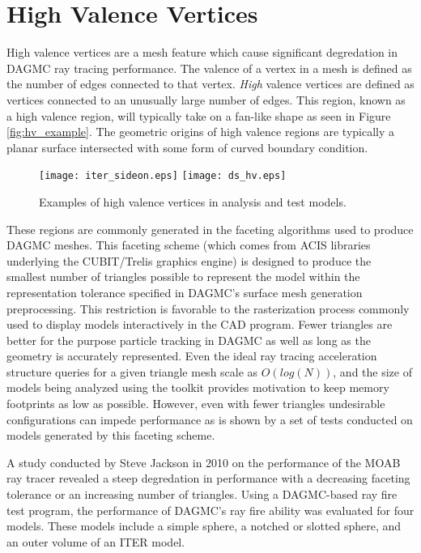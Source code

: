 

\chapter{High Valence Vertices}\label{ch:high_valence}

High valence vertices are a mesh feature which cause significant degredation in
DAGMC ray tracing performance. The valence of a vertex in a mesh is defined as
the number of edges connected to that vertex. \textit{High} valence vertices are
defined as vertices connected to an unusually large number of edges. This
region, known as a high valence region, will typically take on a fan-like shape
as seen in Figure \ref{fig:hv_example}.  The geometric origins of high valence
regions are typically a planar surface intersected with some form of curved
boundary condition. 

\begin{figure}[H]
  \centering
  \texttt{[image: iter\_sideon.eps]}
  \texttt{[image: ds\_hv.eps]}
  \caption{Examples of high valence vertices in analysis and test models.}
  \label{fig:hv_examples}
\end{figure}

These regions are commonly generated in the faceting algorithms used to produce
DAGMC meshes. This faceting scheme (which comes from ACIS libraries underlying
the CUBIT/Trelis graphics engine) is designed to produce the smallest number of
triangles possible to represent the model within the representation tolerance
specified in DAGMC's surface mesh generation preprocessing. This restriction is
favorable to the rasterization process commonly used to display models
interactively in the CAD program. Fewer triangles are better for the purpose
particle tracking in DAGMC as well as long as the geometry is accurately
represented. Even the ideal ray tracing acceleration structure queries for a
given triangle mesh scale as $O(log(N))$, and the size of models being analyzed
using the toolkit provides motivation to keep memory footprints as low as
possible. However, even with fewer triangles undesirable configurations can
impede performance as is shown by a set of tests conducted on models generated
by this faceting scheme.

A study conducted by Steve Jackson in 2010 on the performance of the MOAB ray
tracer revealed a steep degredation in performance with a decreasing faceting
tolerance or an increasing number of triangles. Using a DAGMC-based ray fire
test program, the performance of DAGMC's ray fire ability was evaluated for four
models. These models include a simple sphere, a notched or slotted sphere, and
an outer volume of an ITER model.




